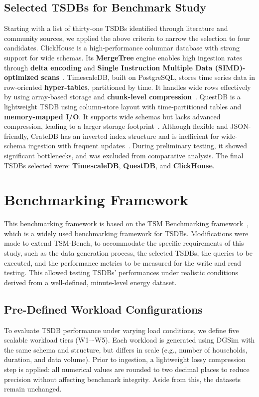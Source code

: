 \documentclass[conference]{IEEEtran}
\begin{document}
\subsection{Selected TSDBs for Benchmark Study}
Starting with a list of thirty-one TSDBs identified through literature and community sources, we applied the above criteria to narrow the selection to four candidates.
ClickHouse is a high-performance columnar database with strong support for wide schemas. Its \textbf{MergeTree} engine enables high ingestion rates through \textbf{delta encoding} and \textbf{Single Instruction Multiple Data (SIMD)-optimized scans}~\cite{6_clickbench}.
TimescaleDB, built on PostgreSQL, stores time series data in row-oriented \textbf{hyper-tables}, partitioned by time. It handles wide rows effectively by using array-based storage and \textbf{chunk-level compression}~\cite{2_tsmsurvey2017}.
 QuestDB is a lightweight TSDB using column-store layout with time-partitioned tables and \textbf{memory-mapped I/O}. It supports wide schemas but lacks advanced compression, leading to a larger storage footprint~\cite{13_questdbdocs}.
Although flexible and JSON-friendly, CrateDB has an inverted index structure and is inefficient for wide-schema ingestion with frequent updates~\cite{15_rinaldi2019}. During preliminary testing, it showed significant bottlenecks, and was excluded from comparative analysis.
The final TSDBs selected were: \textbf{TimescaleDB}, \textbf{QuestDB}, and \textbf{ClickHouse}.

\section{Benchmarking Framework}\label{sec:framework}

This benchmarking framework is based on the TSM Benchmarking framework~\cite{1_tsmbench2023}, which is a widely used benchmarking framework for TSDBs.  Modifications were made to extend TSM-Bench, to accommodate the specific requirements of this study, such as the data generation process, the selected TSDBs, the queries to be executed, and the performance metrics to be measured for the write and read testing. This allowed testing TSDBs' performances under realistic conditions derived from a well-defined, minute-level energy dataset.

\subsection{Pre-Defined Workload Configurations}
To evaluate TSDB performance under varying load conditions, we define five scalable workload tiers (W1–-W5). Each workload is generated using DGSim with the same schema and structure, but differs in scale (e.g., number of households, duration, and data volume). Prior to ingestion, a lightweight lossy compression step is applied: all numerical values are rounded to two decimal places to reduce precision without affecting benchmark integrity. Aside from this, the datasets remain unchanged.
\end{document}
